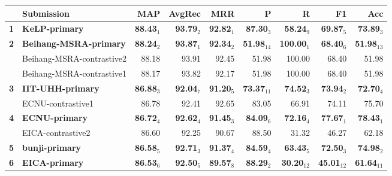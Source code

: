 \begin{table*}[tbh]
\begin{center}
\begin{tabular}{clrrrrrrr}
& \bf Submission & \bf MAP & \bf \scriptsize AvgRec & \bf \scriptsize MRR & \bf \scriptsize P & \bf \scriptsize R & \bf \scriptsize F1 & \bf \scriptsize Acc\\
\hline
\bf 1 & \bf KeLP-primary & \bf 88.43$_{1}$ & \bf \scriptsize 93.79$_{2}$ & \bf \scriptsize 92.82$_{1}$ & \bf \scriptsize 87.30$_{3}$ & \bf \scriptsize 58.24$_{9}$ & \bf \scriptsize 69.87$_{5}$ & \bf \scriptsize 73.89$_{3}$ \\
\bf 2 & \bf Beihang-MSRA-primary & \bf 88.24$_{2}$ & \bf \scriptsize 93.87$_{1}$ & \bf \scriptsize 92.34$_{2}$ & \bf \scriptsize 51.98$_{14}$ & \bf \scriptsize 100.00$_{1}$ & \bf \scriptsize 68.40$_{6}$ & \bf \scriptsize 51.98$_{13}$ \\
& Beihang-MSRA-contrastive2 & 88.18 & \scriptsize 93.91 & \scriptsize 92.45 & \scriptsize 51.98 & \scriptsize 100.00 & \scriptsize 68.40 & \scriptsize 51.98 \\
& Beihang-MSRA-contrastive1 & 88.17 & \scriptsize 93.82 & \scriptsize 92.17 & \scriptsize 51.98 & \scriptsize 100.00 & \scriptsize 68.40 & \scriptsize 51.98 \\
\bf 3 & \bf IIT-UHH-primary & \bf 86.88$_{3}$ & \bf \scriptsize 92.04$_{7}$ & \bf \scriptsize 91.20$_{5}$ & \bf \scriptsize 73.37$_{11}$ & \bf \scriptsize 74.52$_{3}$ & \bf \scriptsize 73.94$_{2}$ & \bf \scriptsize 72.70$_{4}$ \\
& ECNU-contrastive1 & 86.78 & \scriptsize 92.41 & \scriptsize 92.65 & \scriptsize 83.05 & \scriptsize 66.91 & \scriptsize 74.11 & \scriptsize 75.70 \\
\bf 4 & \bf ECNU-primary & \bf 86.72$_{4}$ & \bf \scriptsize 92.62$_{4}$ & \bf \scriptsize 91.45$_{3}$ & \bf \scriptsize 84.09$_{6}$ & \bf \scriptsize 72.16$_{4}$ & \bf \scriptsize 77.67$_{1}$ & \bf \scriptsize 78.43$_{1}$ \\
& EICA-contrastive2 & 86.60 & \scriptsize 92.25 & \scriptsize 90.67 & \scriptsize 88.50 & \scriptsize 31.32 & \scriptsize 46.27 & \scriptsize 62.18 \\
\bf 5 & \bf bunji-primary & \bf 86.58$_{5}$ & \bf \scriptsize 92.71$_{3}$ & \bf \scriptsize 91.37$_{4}$ & \bf \scriptsize 84.59$_{4}$ & \bf \scriptsize 63.43$_{5}$ & \bf \scriptsize 72.50$_{3}$ & \bf \scriptsize 74.98$_{2}$ \\
\bf 6 & \bf EICA-primary & \bf 86.53$_{6}$ & \bf \scriptsize 92.50$_{5}$ & \bf \scriptsize 89.57$_{8}$ & \bf \scriptsize 88.29$_{2}$ & \bf \scriptsize 30.20$_{12}$ & \bf \scriptsize 45.01$_{12}$ & \bf \scriptsize 61.64$_{11}$ \\

\end{tabular}
\end{center}
\end{table*}
